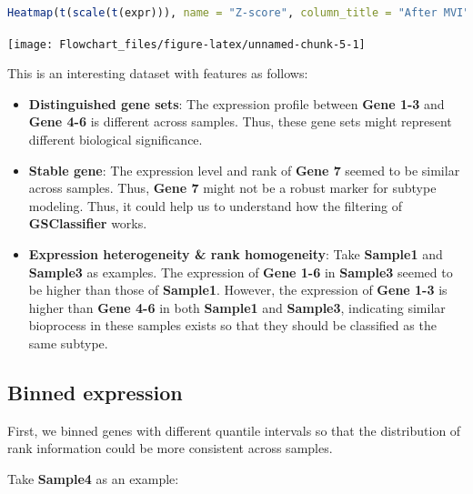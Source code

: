 \documentclass[
  12pt,
]{book}
\begin{document}
\begin{lstlisting}[language=R]
Heatmap(t(scale(t(expr))), name = "Z-score", column_title = "After MVI")
\end{lstlisting}

\begin{center}\texttt{[image: Flowchart\_files/figure-latex/unnamed-chunk-5-1]} \end{center}

This is an interesting dataset with features as follows:

\begin{itemize}
\item
  \textbf{Distinguished gene sets}: The expression profile between \textbf{Gene 1-3} and \textbf{Gene 4-6} is different across samples. Thus, these gene sets might represent different biological significance.
\item
  \textbf{Stable gene}: The expression level and rank of \textbf{Gene 7} seemed to be similar across samples. Thus, \textbf{Gene 7} might not be a robust marker for subtype modeling. Thus, it could help us to understand how the filtering of \textbf{GSClassifier} works.
\item
  \textbf{Expression heterogeneity \& rank homogeneity}: Take \textbf{Sample1} and \textbf{Sample3} as examples. The expression of \textbf{Gene 1-6} in \textbf{Sample3} seemed to be higher than those of \textbf{Sample1}. However, the expression of \textbf{Gene 1-3} is higher than \textbf{Gene 4-6} in both \textbf{Sample1} and \textbf{Sample3}, indicating similar bioprocess in these samples exists so that they should be classified as the same subtype.
\end{itemize}

\hypertarget{binned-expression}{%
\subsection{Binned expression}\label{binned-expression}}

First, we binned genes with different quantile intervals so that the distribution of rank information could be more consistent across samples.

Take \textbf{Sample4} as an example:
\end{document}
